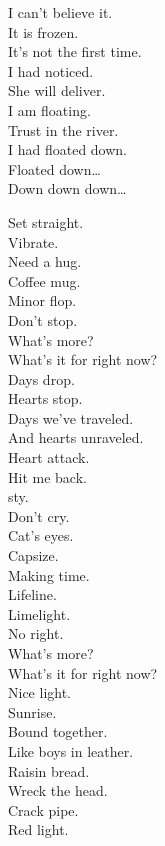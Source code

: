I can't believe it. \\
It is frozen. \\
It's not the first time. \\
I had noticed. \\
She will deliver. \\
I am floating. \\
Trust in the river. \\
I had floated down. \\

Floated down… \\
Down down down… \\




Set straight. \\
Vibrate. \\
Need a hug. \\
Coffee mug. \\
Minor flop. \\
Don't stop. \\
What's more? \\
What's it for right now? \\

Days drop. \\
Hearts stop. \\
Days we've traveled. \\
And hearts unraveled. \\
Heart attack. \\
Hit me back. \\
 sty. \\
Don't cry. \\

Cat's eyes. \\
Capsize. \\
Making time. \\
Lifeline. \\
Limelight. \\
No right. \\
What's more? \\
What's it for right now? \\

Nice light. \\
Sunrise. \\
Bound together. \\
Like boys in leather. \\
Raisin bread. \\
Wreck the head. \\
Crack pipe. \\
Red light. \\

